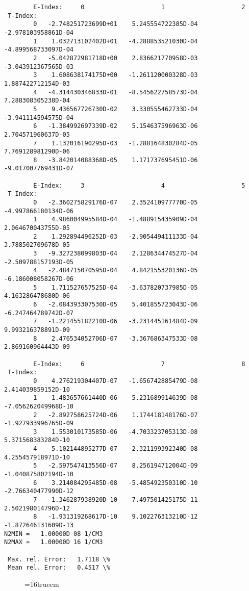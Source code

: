 \documentclass[12pt,dvipdfmx]{article}
\begin{document}
\begin{small}\begin{verbatim}
        E-Index:     0                     1                     2
 T-Index:
        0   -2.748251723699D+01    5.245554722385D-04   -2.978103958861D-04
        1    1.032713102402D+01   -4.288853521030D-04   -4.899568733097D-04
        2   -5.042872981718D+00    2.836621770958D-03   -3.043912367565D-03
        3    1.608638174175D+00   -1.261120000328D-03    1.887422712154D-03
        4   -4.314430346833D-01   -8.545622758573D-04    7.288308305238D-04
        5    9.436567726730D-02    3.330555462733D-04   -3.941114594575D-04
        6   -1.384992697339D-02    5.154637596963D-06    2.704571960637D-05
        7    1.132016190295D-03   -1.288164830284D-05    7.769128981290D-06
        8   -3.842014088368D-05    1.171737695451D-06   -9.017007769431D-07

        E-Index:     3                     4                     5
 T-Index:
        0   -2.360275829176D-07    2.352410977770D-05   -4.997866180134D-06
        1    4.986004995584D-04   -1.488915435909D-04    2.064670043755D-05
        2    1.292894496252D-03   -2.905449411133D-04    3.788502709678D-05
        3   -9.327238099803D-04    2.128634474527D-04   -2.509788157193D-05
        4   -2.484715070595D-04    4.842155320136D-05   -6.186008058267D-06
        5    1.711527657525D-04   -3.637820737985D-05    4.163286478680D-06
        6   -2.084393307530D-05    5.401855723043D-06   -6.247464789742D-07
        7   -1.221455182210D-06   -3.231445161484D-09    9.993216378891D-09
        8    2.476534052706D-07   -3.367686347533D-08    2.869160964443D-09

        E-Index:     6                     7                     8
 T-Index:
        0    4.276219304407D-07   -1.656742885479D-08    2.414039859152D-10
        1   -1.483657661440D-06    5.231689914639D-08   -7.056262049968D-10
        2   -2.892758625724D-06    1.174418148176D-07   -1.927933996765D-09
        3    1.553010173585D-06   -4.703323705313D-08    5.371568383284D-10
        4    5.102144895277D-07   -2.321199392340D-08    4.255457918971D-10
        5   -2.597547413556D-07    8.256194712004D-09   -1.040875802194D-10
        6    3.214084295485D-08   -5.485492350310D-10   -2.766340477990D-12
        7    1.346287938920D-10   -7.497501425175D-11    2.502198014796D-12
        8   -1.931319268617D-10    9.102276313210D-12   -1.872646131609D-13
N2MIN =   1.00000D 08 1/CM3
N2MAX =   1.00000D 16 1/CM3

 Max. rel. Error:   1.7118 \%
 Mean rel. Error:   0.4517 \%

\end{verbatim}\end{small}
\begin{figure} \label{2.2.5}
\epsfxsize=16truecm
\end{figure}
\newpage
\end{document}
